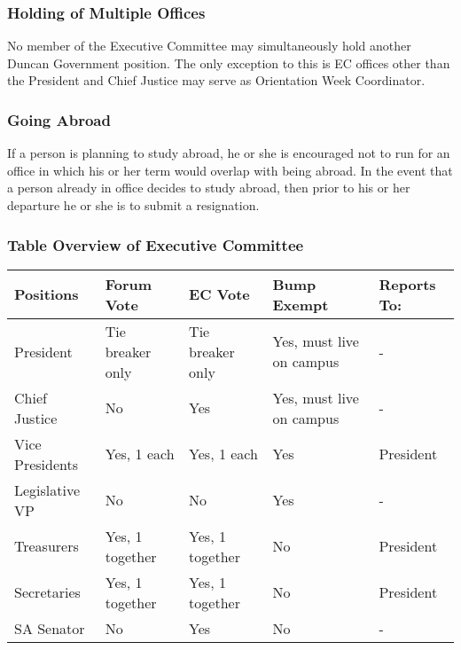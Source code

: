 \documentclass[USletter,12pt]{article}
\begin{document}
\subsubsection{Holding of Multiple Offices}
No member of the Executive Committee may simultaneously hold another Duncan Government position.  The only exception to this is EC offices other than the President and Chief Justice may serve as Orientation Week Coordinator.

\subsubsection{Going Abroad}
If a person is planning to study abroad, he or she is encouraged not to run for an office in which his or her term would overlap with being abroad.  In the event that a person already in office decides to study abroad, then prior to his or her departure he or she is to submit a resignation.

\subsubsection{Table Overview of Executive Committee}
\begin{tabular}{|l| l| l| l| l|}
\hline
	\bfseries{Positions}&\bfseries{Forum Vote}&\bfseries{EC Vote}&\bfseries{Bump Exempt}&\bfseries{Reports To:}\\
\hline\hline
	President&Tie breaker only&Tie breaker only&Yes, must live on campus&-\\
\hline
	Chief Justice&No&Yes&Yes, must live on campus&-\\
\hline
	Vice Presidents&Yes, 1 each&Yes, 1 each&Yes&President\\
\hline
	Legislative VP&No&No&Yes&-\\
\hline
	Treasurers&Yes, 1 together&Yes, 1 together&No&President\\
\hline
	Secretaries&Yes, 1 together&Yes, 1 together&No&President\\
\hline
	SA Senator&No&Yes&No&-\\
\hline
\end{tabular}
\end{document}
